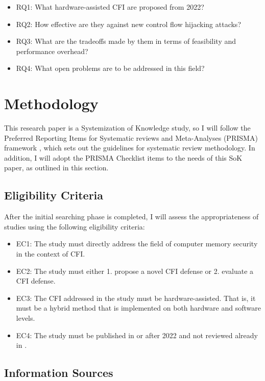 \documentclass[journal,onecolumn]{IEEEtran}
\begin{document}
\begin{itemize}
    \item RQ1: What hardware-assisted CFI are proposed from 2022?
    \item RQ2: How effective are they against new control flow hijacking attacks?
    \item RQ3: What are the tradeoffs made by them in terms of feasibility and performance overhead?
    \item RQ4: What open problems are to be addressed in this field?
\end{itemize}

\section{Methodology}

This research paper is a Systemization of Knowledge study, so I will follow the Preferred Reporting Items for Systematic reviews and Meta-Analyses (PRISMA) framework \cite{Page22}, which sets out the guidelines for systematic review methodology. In addition, I will adopt the PRISMA Checklist items to the needs of this SoK paper, as outlined in this section.

\subsection{Eligibility Criteria}

After the initial searching phase is completed, I will assess the appropriateness of studies using the following eligibility criteria:

\begin{itemize}
    \item EC1: The study must directly address the field of computer memory security in the context of CFI.
    \item EC2: The study must either 1. propose a novel CFI defense or 2. evaluate a CFI defense.
    \item EC3: The CFI addressed in the study must be hardware-assisted. That is, it must be a hybrid method that is implemented on both hardware and software levels.
    \item EC4: The study must be published in or after 2022 and not reviewed already in \cite{Kumar22}.
\end{itemize}

\subsection{Information Sources}
\end{document}
